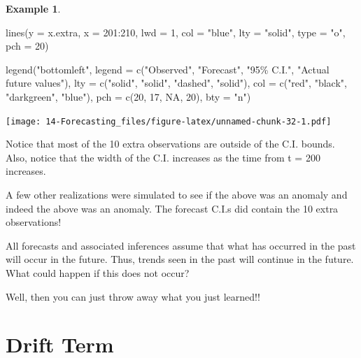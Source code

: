 \documentclass[
]{book}
\newenvironment{Shaded}{\begin{snugshade}}{\end{snugshade}}
\newcommand{\AttributeTok}[1]{\textcolor[rgb]{0.77,0.63,0.00}{#1}}
\newcommand{\ConstantTok}[1]{\textcolor[rgb]{0.00,0.00,0.00}{#1}}
\newcommand{\DecValTok}[1]{\textcolor[rgb]{0.00,0.00,0.81}{#1}}
\newcommand{\FunctionTok}[1]{\textcolor[rgb]{0.00,0.00,0.00}{#1}}
\newcommand{\NormalTok}[1]{#1}
\newcommand{\SpecialCharTok}[1]{\textcolor[rgb]{0.00,0.00,0.00}{#1}}
\newcommand{\StringTok}[1]{\textcolor[rgb]{0.31,0.60,0.02}{#1}}
\theoremstyle{definition}
\theoremstyle{definition}
\newtheorem{example}{Example}[chapter]
\theoremstyle{definition}
\theoremstyle{definition}
\theoremstyle{remark}
\begin{document}
\begin{example}
\begin{Shaded}
\begin{Highlighting}[]
\FunctionTok{lines}\NormalTok{(}\AttributeTok{y =}\NormalTok{ x.extra, }\AttributeTok{x =} \DecValTok{201}\SpecialCharTok{:}\DecValTok{210}\NormalTok{, }\AttributeTok{lwd =} \DecValTok{1}\NormalTok{, }\AttributeTok{col =} \StringTok{"blue"}\NormalTok{, }\AttributeTok{lty =} \StringTok{"solid"}\NormalTok{, }\AttributeTok{type =} \StringTok{"o"}\NormalTok{, }\AttributeTok{pch =} \DecValTok{20}\NormalTok{) }
  
\FunctionTok{legend}\NormalTok{(}\StringTok{"bottomleft"}\NormalTok{, }\AttributeTok{legend =} \FunctionTok{c}\NormalTok{(}\StringTok{"Observed"}\NormalTok{, }\StringTok{"Forecast"}\NormalTok{, }\StringTok{"95\% C.I."}\NormalTok{, }\StringTok{"Actual future values"}\NormalTok{), }
         \AttributeTok{lty =} \FunctionTok{c}\NormalTok{(}\StringTok{"solid"}\NormalTok{, }\StringTok{"solid"}\NormalTok{, }\StringTok{"dashed"}\NormalTok{, }\StringTok{"solid"}\NormalTok{),}
         \AttributeTok{col =} \FunctionTok{c}\NormalTok{(}\StringTok{"red"}\NormalTok{, }\StringTok{"black"}\NormalTok{, }\StringTok{"darkgreen"}\NormalTok{, }\StringTok{"blue"}\NormalTok{), }\AttributeTok{pch =} \FunctionTok{c}\NormalTok{(}\DecValTok{20}\NormalTok{, }\DecValTok{17}\NormalTok{, }\ConstantTok{NA}\NormalTok{, }\DecValTok{20}\NormalTok{), }\AttributeTok{bty =} \StringTok{"n"}\NormalTok{)}
\end{Highlighting}
\end{Shaded}

\texttt{[image: 14-Forecasting\_files/figure-latex/unnamed-chunk-32-1.pdf]}

Notice that most of the 10 extra observations are outside of the C.I. bounds. Also, notice that the width of the C.I. increases as the time from t = 200 increases.

A few other realizations were simulated to see if the above was an anomaly and indeed the above was an anomaly. The forecast C.I.s did contain the 10 extra observations!
\end{example}

All forecasts and associated inferences assume that what has occurred in the past will occur in the future. Thus, trends seen in the past will continue in the future. What could happen if this does not occur?

Well, then you can just throw away what you just learned!!

\hypertarget{drift-term}{%
\chapter{Drift Term}\label{drift-term}}
\end{document}
